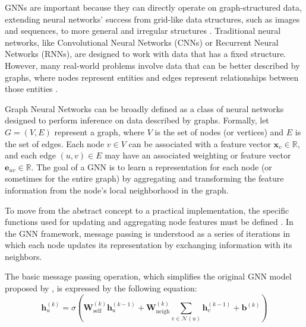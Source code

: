 GNNs are important because they can directly operate on graph-structured data, extending neural networks' success from grid-like data structures, such as images and sequences, to more general and irregular structures \cite{Jia_Wang_Shou_Hosseini_Bai_2023a} . Traditional neural networks, like Convolutional Neural Networks (CNNs) or Recurrent Neural Networks (RNNs), are designed to work with data that has a fixed structure. However, many real-world problems involve data that can be better described by graphs, where nodes represent entities and edges represent relationships between those entities \cite{Gupta_Matta_Pant_2021}. 

Graph Neural Networks can be broadly defined as a class of neural networks designed to perform inference on data described by graphs. Formally, let $G = (V, E)$ represent a graph, where $V$ is the set of nodes (or vertices) and $E$ is the set of edges. Each node $v \in V$ can be associated with a feature vector $\mathbf{x}_v \in \mathbb{R}$, and each edge $(u, v) \in E$ may have an associated weighting or feature vector $\mathbf{e}_{uv} \in \mathbb{R}$. The goal of a GNN is to learn a representation for each node (or sometimes for the entire graph) by aggregating and transforming the feature information from the node's local neighborhood in the graph.


 To move from the abstract concept to a practical implementation, the specific functions used for updating and aggregating node features must be defined \cite{Liu_Wu_Liu_Hu_2021}. In the GNN framework, message passing is understood as a series of iterations in which each node updates its representation by exchanging information with its neighbors. 

The basic message passing operation, which simplifies the original GNN model proposed by \cite{GRLB_Hamilton}, is expressed by the following equation:
\begin{equation}
 \mathbf{h}_u^{(k)} = \sigma\left( \mathbf{W}_{\text{self}}^{(k)} \mathbf{h}_u^{(k-1)} + \mathbf{W}_{\text{neigh}}^{(k)} \sum_{v \in \mathcal{N}(u)} \mathbf{h}_v^{(k-1)} + \mathbf{b}^{(k)} \right)  
    \label{eq:message_passing}
\end{equation}

